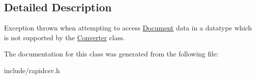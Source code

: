 \subsection{Detailed Description}
Exception thrown when attempting to access \hyperlink{classrapidcsv_1_1Document}{Document} data in a datatype which is not supported by the \hyperlink{classrapidcsv_1_1Converter}{Converter} class. 

The documentation for this class was generated from the following file\+:\begin{DoxyCompactItemize}
\item 
include/rapidcsv.\+h\end{DoxyCompactItemize}
